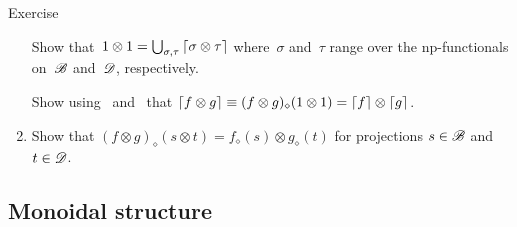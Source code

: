 \documentclass[a]{subfiles}
\begin{document}
\begin{parsec}
\begin{point}{Exercise}
\begin{enumerate}
Show that~$1\otimes 1 
= \bigcup_{\sigma,\tau}\left\lceil\sigma \otimes \tau\right\rceil$
where~$\sigma$ and~$\tau$
range over the np-functionals
on~$\mathscr{B}$ and~$\mathscr{D}$, respectively.

Show using~
and~
that
$\left\lceil f\otimes g\right\rceil \equiv
(f\otimes g)_\diamond(1\otimes 1)
= \left\lceil f\right\rceil\otimes \left\lceil g\right\rceil$.
\item
Show that $(f\otimes g)_\diamond (s\otimes t)
= f_\diamond(s)\otimes g_\diamond(t)$
for projections
$s\in \mathscr{B}$
and~$t\in \mathscr{D}$.
\end{enumerate}
\end{point}
\end{parsec}
\subsection{Monoidal structure}
\end{document}
